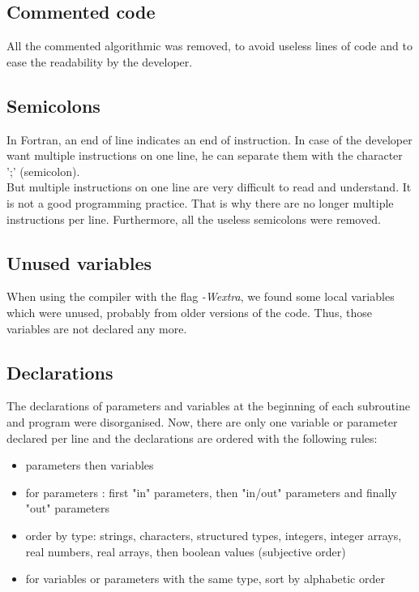 \subsection{Commented code}
All the commented algorithmic was removed, to avoid useless lines of code and to ease the readability by the developer.

\subsection{Semicolons}
In Fortran, an end of line indicates an end of instruction. In case of the developer want multiple instructions on one line, he can separate them with the character ';' (semicolon).
\\But multiple instructions on one line are very difficult to read and understand. It is not a good programming practice. That is why there are no longer multiple instructions per line. Furthermore, all the useless semicolons were removed.

\subsection{Unused variables}
When using the compiler with the flag \textit{-Wextra}, we found some local variables which were unused, probably from older versions of the code. Thus, those variables are not declared any more. 

\subsection{Declarations}
The declarations of parameters and variables at the beginning of each subroutine and program were disorganised. Now, there are only one variable or parameter declared per line and the declarations are ordered with the following rules: 
\begin{itemize}
\item 
parameters then variables
\item
for parameters : first "in" parameters, then "in/out" parameters and finally "out" parameters
\item
order by type: strings, characters, structured types, integers, integer arrays, real numbers, real arrays, then boolean values (subjective order)
\item
for variables or parameters with the same type, sort by alphabetic order
\end{itemize}

